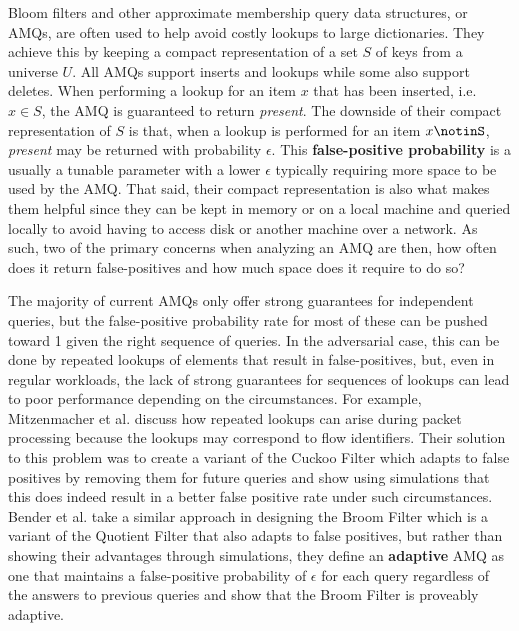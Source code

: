 \documentclass[../paper.tex]{subfiles}
\begin{document}
    Bloom filters and other approximate membership query data structures, or
    AMQs, are often used to help avoid costly lookups to large dictionaries.
    They achieve this by keeping a compact representation of a set
    $S$ of keys from a universe $U$.  All AMQs support inserts and lookups
    while some also support deletes.  When performing a lookup for an item $x$
    that has been inserted, i.e. $x\in S$, the AMQ is guaranteed to return
    {\it present}.  The downside of their compact representation of $S$ is
    that, when a lookup is performed for an item $x \notinS$, {\it present}
    may be returned with probability $\epsilon$.  This {\bf false-positive
    probability} is a usually a tunable parameter with a lower $\epsilon$
    typically requiring more space to be used by the AMQ.  That said, their
    compact representation is also what makes them helpful since they can be
    kept in memory or on a local machine and queried locally to avoid having to
    access disk or another machine over a network.  As such, two of the primary
    concerns when analyzing an AMQ are then, how often does it return
    false-positives and how much space does it require to do so?

    The majority of current AMQs only offer strong guarantees for independent
    queries, but the false-positive probability rate for most of these can be
    pushed toward 1 given the right sequence of queries.  In the adversarial
    case, this can be done by repeated lookups of elements that result in
    false-positives, but, even in regular workloads, the lack of strong
    guarantees for sequences of lookups can lead to poor performance depending
    on the circumstances.  For example, Mitzenmacher et al.
    \cite{adaptive-cuckoo} discuss how repeated lookups can arise during packet
    processing because the lookups may correspond to flow identifiers.  Their
    solution to this problem was to create a variant of the Cuckoo Filter
    \cite{cuckoo-filter} which adapts to false positives by removing them for
    future queries and show using simulations that this does indeed result in a
    better false positive rate under such circumstances.  Bender et al.
    \cite{broom-filter} take a similar approach in designing the Broom Filter
    which is a variant of the Quotient Filter \cite{quotient-filter} that also
    adapts to false positives, but rather than showing their advantages through
    simulations, they define an {\bf adaptive} AMQ as one that maintains a
    false-positive probability of $\epsilon$ for each query regardless of the
    answers to previous queries and show that the Broom Filter is proveably
    adaptive.
\end{document}
